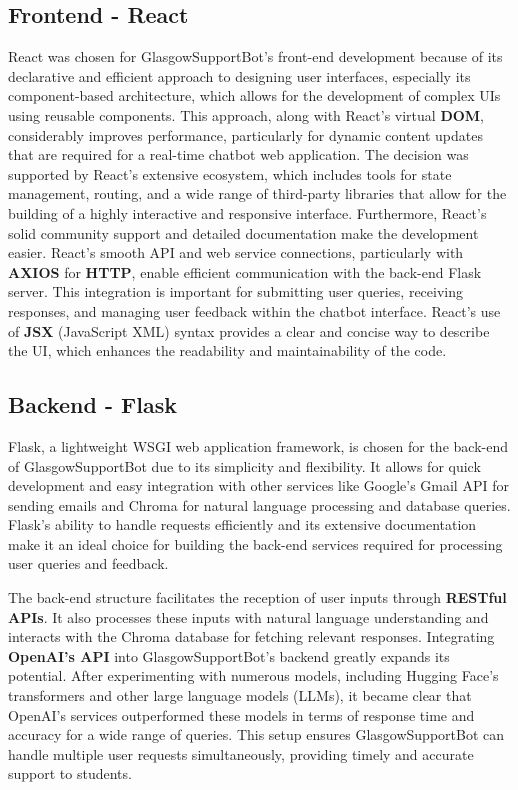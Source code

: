 \documentclass{l4proj}
\begin{document}
\subsection{Frontend - React}

React was chosen for GlasgowSupportBot's front-end development because of its declarative and efficient approach to designing user interfaces, especially its component-based architecture, which allows for the development of complex UIs using reusable components. This approach, along with React's virtual \textbf{DOM}, considerably improves performance, particularly for dynamic content updates that are required for a real-time chatbot web application. The decision was supported by React's extensive ecosystem, which includes tools for state management, routing, and a wide range of third-party libraries that allow for the building of a highly interactive and responsive interface. Furthermore, React's solid community support and detailed documentation make the development easier. React's smooth API and web service connections, particularly with \textbf{AXIOS} for \textbf{HTTP}, enable efficient communication with the back-end Flask server. This integration is important for submitting user queries, receiving responses, and managing user feedback within the chatbot interface. React's use of \textbf{JSX} (JavaScript XML) syntax provides a clear and concise way to describe the UI, which enhances the readability and maintainability of the code.

\subsection{Backend - Flask}

Flask, a lightweight WSGI web application framework, is chosen for the back-end of GlasgowSupportBot due to its simplicity and flexibility. It allows for quick development and easy integration with other services like Google's Gmail API for sending emails and Chroma for natural language processing and database queries. Flask's ability to handle requests efficiently and its extensive documentation make it an ideal choice for building the back-end services required for processing user queries and feedback.

The back-end structure facilitates the reception of user inputs through \textbf{RESTful APIs}. It also processes these inputs with natural language understanding and interacts with the Chroma database for fetching relevant responses. Integrating \textbf{OpenAI's API} into GlasgowSupportBot's backend greatly expands its potential. After experimenting with numerous models, including Hugging Face's transformers and other large language models (LLMs), it became clear that OpenAI's services outperformed these models in terms of response time and accuracy for a wide range of queries. This setup ensures GlasgowSupportBot can handle multiple user requests simultaneously, providing timely and accurate support to students.
\end{document}
